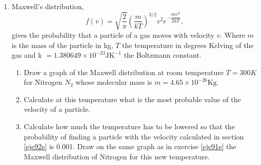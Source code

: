 \begin{paracol}{2}
\begin{enumerate}
\item Maxwell's distribution, 
\begin{equation}
f(v) = \sqrt{\frac{2}{\pi}}\left( \frac{m}{kT}\right)^{3/2}v^2e^{-\dfrac{\scriptstyle mv^2}{\scriptstyle 2kT}},
\end{equation}
gives the probability that a particle of a gas moves with velocity $v$. Where $m$ is the mass of the particle in kg, $T$ the temperature in degrees Kelving of the gas and k $=1.380649\times 10^{-23} \text{JK}^{-1}$ the Boltzmann constant. 
\begin{enumerate}
\item  \label{eje91e}Draw a graph of the Maxwell distribution at room temperature  $T= 300K$ for Nitrogen $N_2$ whose molecular mass is $m = 4.65 \times 10^{-26}	\text{Kg}$.
\item \label{eje92e}Calculate at this temperature what is the most probable value of the velocity of a particle.
\item Calculate how much the temperature has to be lowered so that the probability of finding a particle with the velocity calculated in section \ref{eje92e} is 0.001. Draw on the same graph as in exercise \ref{eje91e} the Maxwell distribution of Nitrogen for this new temperature. 

\end{enumerate}

\end{enumerate}    
\end{paracol}
